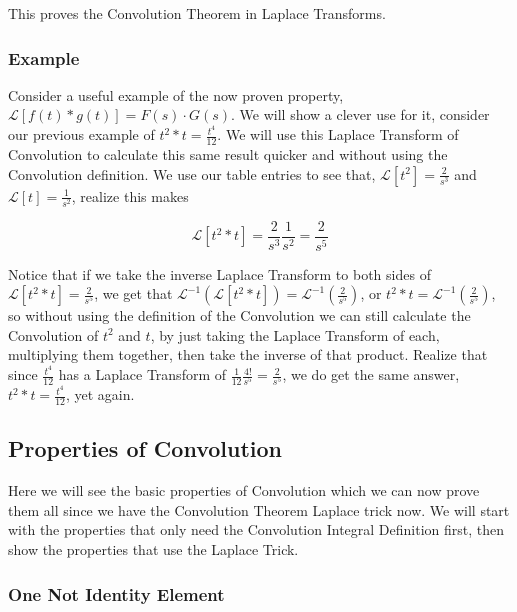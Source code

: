 \documentclass[12pt]{article}
\newcommand{\lp}{\mathscr{L}}
\begin{document}
This proves the Convolution Theorem in Laplace Transforms.

\subsubsection{Example}

Consider a useful example of the now proven property, $\lp[f(t) \ast g(t)]=F(s)\cdot G(s)$. We will show a clever use for it, consider our previous example of $t^2 \ast t = \frac{t^4}{12}$. We will use this Laplace Transform of Convolution to calculate this same result quicker and without using the Convolution definition. We use our table entries to see that, $\lp[t^2]=\frac{2}{s^3}$ and $\lp[t]=\frac{1}{s^2}$, realize this makes

\begin{equation*}
    \lp[t^2 \ast t] = \frac{2}{s^3}\frac{1}{s^2}=\frac{2}{s^5}
\end{equation*}

Notice that if we take the inverse Laplace Transform to both sides of $\lp[t^2 \ast t] = \frac{2}{s^5}$, we get that $\lp^{-1}(\lp[t^2 \ast t]) = \lp^{-1}\left(\frac{2}{s^5}\right)$, or $t^2 \ast t=\lp^{-1}\left(\frac{2}{s^5}\right)$, so without using the definition of the Convolution we can still calculate the Convolution of $t^2$ and $t$, by just taking the Laplace Transform of each, multiplying them together, then take the inverse of that product. Realize that since $\frac{t^4}{12}$ has a Laplace Transform of $\frac{1}{12}\frac{4!}{s^5}=\frac{2}{s^5}$, we do get the same answer, $t^2 \ast t = \frac{t^4}{12}$, yet again.

\subsection{Properties of Convolution}

Here we will see the basic properties of Convolution which we can now prove them all since we have the Convolution Theorem Laplace trick now. We will start with the properties that only need the Convolution Integral Definition first, then show the properties that use the Laplace Trick.

\subsubsection{One Not Identity Element}
\end{document}
